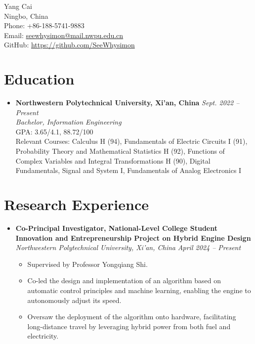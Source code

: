 \documentclass[a4paper,10pt]{article}
\begin{document}
	
	\begin{center}
		{\LARGE Yang Cai}\\
		\vspace{0.1cm}
		Ningbo, China \\
		Phone: +86-188-5741-9883 \\
		Email: \href{mailto:seewhysimon@mail.nwpu.edu.cn}{seewhysimon@mail.nwpu.edu.cn} \\
		GitHub: \href{https://github.com/SeeWhysimon}{https://github.com/SeeWhysimon} %
	\end{center}

\section*{Education}
\begin{itemize}[leftmargin=0.5cm]
    \item \textbf{Northwestern Polytechnical University, Xi'an, China} \hfill \textit{Sept. 2022 -- Present} \\
    \textit{Bachelor, Information Engineering} \\
    GPA: 3.65/4.1, 88.72/100 \\
    Relevant Courses: Calculus H (94), 
                      Fundamentals of Electric Circuits I (91), 
                      Probability Theory and Mathematical Statistics H (92),
                      Functions of Complex Variables and Integral Transformations H (90), 
                      Digital Fundamentals, 
                      Signal and System I, 
                      Fundamentals of Analog Electronics I

\end{itemize}

\section*{Research Experience}
\begin{itemize}[leftmargin=0.5cm]
    \item \textbf{Co-Principal Investigator, National-Level College Student Innovation and Entrepreneurship Project on Hybrid Engine Design} \\
    \textit{Northwestern Polytechnical University, Xi'an, China} \hfill \textit{April 2024 -- Present} 
    
    \begin{itemize}
        \item Supervised by Professor Yongqiang Shi.
        \item Co-led the design and implementation of an algorithm based on automatic control principles and machine learning, enabling the engine to autonomously adjust its speed.
        \item Oversaw the deployment of the algorithm onto hardware, facilitating long-distance travel by leveraging hybrid power from both fuel and electricity.
    \end{itemize}
    
\end{itemize}
\end{document}

